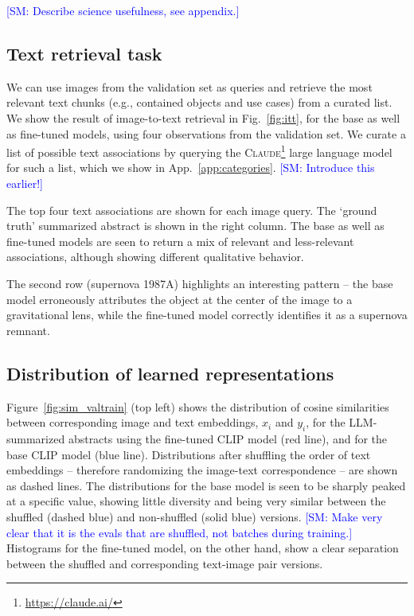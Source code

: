 \documentclass[10pt]{article} %
\newcommand{\SM}[1]{\textcolor{blue}{[SM: #1]}}
\begin{document}
\SM{Describe science usefulness, see appendix.}

\subsection{Text retrieval task}

We can use images from the validation set as queries and retrieve the most relevant text chunks (e.g., contained objects and use cases) from a curated list.
%
We show the result of image-to-text retrieval in Fig.~\ref{fig:itt}, for the base as well as fine-tuned models, using four observations from the validation set.
%
We curate a list of possible text associations by querying the \textsc{Claude}\footnote{\url{https://claude.ai/}} large language model for such a list, which we show in App.~\ref{app:categories}. \SM{Introduce this earlier!}

The top four text associations are shown for each image query.
%
The `ground truth' summarized abstract is shown in the right column.
%
The base as well as fine-tuned models are seen to return a mix of relevant and less-relevant associations, although showing different qualitative behavior.
%

The second row (supernova 1987A) highlights an interesting pattern -- the base model erroneously attributes the object at the center of the image to a gravitational lens, while the fine-tuned model correctly identifies it as a supernova remnant.

\subsection{Distribution of learned representations}

Figure~\ref{fig:sim_valtrain} (top left) shows the distribution of cosine similarities between corresponding image and text embeddings, $x_i$ and $y_i$, for the LLM-summarized abstracts using the fine-tuned CLIP model (red line), and for the base CLIP model (blue line).
%
Distributions after shuffling the order of text embeddings -- therefore randomizing the image-text correspondence -- are shown as dashed lines.
%
The distributions for the base model is seen to be sharply peaked at a specific value, showing little diversity and being very similar between the shuffled (dashed blue) and non-shuffled (solid blue) versions. \SM{Make very clear that it is the evals that are shuffled, not batches during training.}
%
Histograms for the fine-tuned model, on the other hand, show a clear separation between the shuffled and corresponding text-image pair versions.
\end{document}
